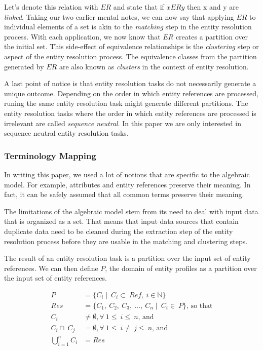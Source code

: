 Let's denote this relation with $ER$ and state that if $xERy$ then x and y
are \textit{linked}\cite{Tal11}.
Taking our two earlier mental notes, we can now say that applying $ER$ to
individual elements of a set is akin to the \textit{matching} step in the
entity resolution process.
With each application, we now know that $ER$ creates a partition over the
initial set.
This side-effect of equivalence relationships is the \textit{clustering}
step or aspect of the entity resolution process.
The equivalence classes from the partition generated by $ER$ are also known
as \textit{clusters} in the context of entity resolution.

A last point of notice is that entity resolution tasks do not necessarily
generate a unique outcome\cite{Tal11}.
Depending on the order in which entity references are processed, runing the
same entity resolution task might generate different partitions.
The entity resolution tasks where the order in which entity references are
processed is irrelevant are called \textit{sequence neutral}\cite{Tal11}.
In this paper we are only interested in sequence neutral entity resolution
tasks.

\subsubsection[algrel]{Terminology Mapping}\label{subsubsec:algrel}

In writing this paper, we used a lot of notions that are specific to the
algebraic model.
For example, attributes and entity references preserve their meaning.
In fact, it can be safely assumed that all common terms preserve their
meaning.

The limitations of the algebraic model stem from its need to deal with input
data that is organized as a set.
That means that input data sources that contain duplicate data need to be
cleaned during the extraction step of the entity resolution process before they
are usable in the matching and clustering steps.

The result of an entity resolution task is a partition over the input set of
entity references.
We can then define $P$, the domain of entity profiles as a partition over the
input set of entity references.

\begin{align}
    P &= \{C_i\mid~C_i\subset~Ref,~i\in\mathbb{N}\}\nonumber\\
    Res &= \{C_1,~C_2,~C_3,~\ldots,~C_n\mid~C_i\in~P\}\textrm{, so that}\nonumber\\
    C_i&\neq\emptyset,\forall~1\leq~i\leq~n\textrm{,~and}\nonumber\\
    C_i\cap~C_j&=\emptyset,\forall~1\leq~i\neq~j\leq~n\textrm{,~and}\nonumber\\
    \bigcup_{i=1}^{n}C_i&=Res\nonumber
\end{align}

